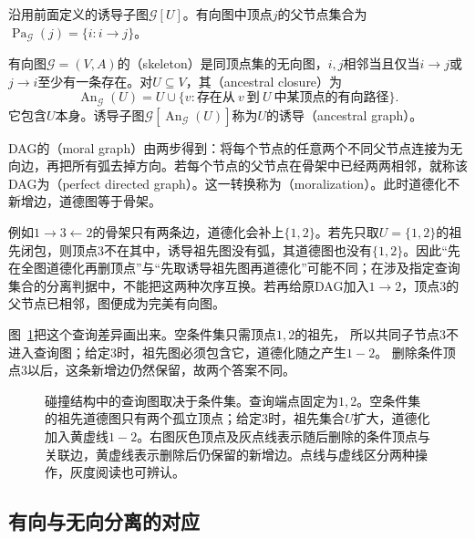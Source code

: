 沿用前面定义的诱导子图\(\mathcal G[U]\)。有向图中顶点\(j\)的父节点集合为\(\operatorname{Pa}_{\mathcal G}(j)=\{i:i\to j\}\)。
\begin{definition}[骨架、祖先闭包与诱导祖先图]
  \label{def:graph-theory-directed-structure}
  有向图\(\mathcal G=(V,A)\)的（skeleton）是同顶点集的无向图，\(i,j\)相邻当且仅当\(i\to j\)或\(j\to i\)至少有一条存在。对\(U\subseteq V\)，其（ancestral closure）为
  \[
    \operatorname{An}_{\mathcal G}(U)
    =U\cup\{v:\text{存在从}\ v\ \text{到}\ U\ \text{中某顶点的有向路径}\}.
  \]
  它包含\(U\)本身。诱导子图\(\mathcal G[\operatorname{An}_{\mathcal G}(U)]\)称为\(U\)的诱导（ancestral graph）。
\end{definition}
\begin{definition}[道德图与完美有向图]
  \label{def:graph-theory-moral-perfect}
  DAG的（moral graph）由两步得到：将每个节点的任意两个不同父节点连接为无向边，再把所有弧去掉方向。若每个节点的父节点在骨架中已经两两相邻，就称该DAG为（perfect directed graph）。这一转换称为（moralization）。此时道德化不新增边，道德图等于骨架。
\end{definition}
例如\(1\to3\leftarrow2\)的骨架只有两条边，道德化会补上\(\{1,2\}\)。若先只取\(U=\{1,2\}\)的祖先闭包，则顶点\(3\)不在其中，诱导祖先图没有弧，其道德图也没有\(\{1,2\}\)。因此“先在全图道德化再删顶点”与“先取诱导祖先图再道德化”可能不同；在涉及指定查询集合的分离判据中，不能把这两种次序互换。若再给原DAG加入\(1\to2\)，顶点\(3\)的父节点已相邻，图便成为完美有向图。

图~\ref{fig:graph-theory-ancestor-moral-query}把这个查询差异画出来。空条件集只需顶点\(1,2\)的祖先，
所以共同子节点\(3\)不进入查询图；给定\(3\)时，祖先图必须包含它，道德化随之产生\(1-2\)。
删除条件顶点\(3\)以后，这条新增边仍然保留，故两个答案不同。

\begin{figure}[htbp]
  \centering
  
  \caption{碰撞结构中的查询图取决于条件集。查询端点固定为\(1,2\)。空条件集的祖先道德图只有两个孤立顶点；给定\(3\)时，祖先集合\(U\)扩大，道德化加入黄虚线\(1-2\)。右图灰色顶点及灰点线表示随后删除的条件顶点与关联边，黄虚线表示删除后仍保留的新增边。点线与虚线区分两种操作，灰度阅读也可辨认。}
  \label{fig:graph-theory-ancestor-moral-query}
\end{figure}

\subsection{有向与无向分离的对应}
\label{sec:graph-theory-separation-correspondence}

